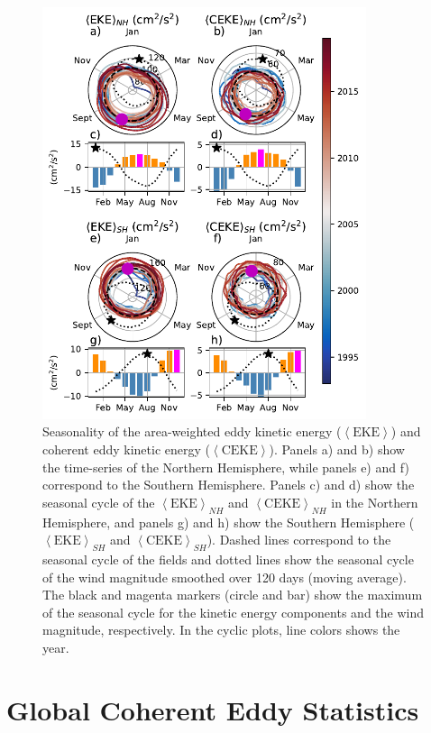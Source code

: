 \documentclass[draft,linenumbers]{agujournal2019}
\newcommand{\EKE}{\textrm{EKE}}
\newcommand{\CEKE}{\textrm{CEKE}}
\begin{document}
	\begin{figure}
	    \centering
	    \includegraphics[width=95mm]{figures/All_polar_plots.pdf}
	    \caption{Seasonality of the area-weighted eddy kinetic energy ($\left<\EKE\right>$) and coherent eddy kinetic energy ($\left<\CEKE\right>$). 
		Panels a) and b) show the time-series of the Northern Hemisphere, while panels e) and f) correspond to the Southern Hemisphere. Panels c) and d) show the seasonal cycle of the $\left<\EKE\right>_{NH}$ and $\left<\CEKE\right>_{NH}$ in the Northern Hemisphere, and panels g) and h) show the Southern Hemisphere ($\left<\EKE\right>_{SH}$ and $\left<\CEKE\right>_{SH}$).
		Dashed lines correspond to the seasonal cycle of the fields and dotted lines show the seasonal cycle of the wind magnitude smoothed over 120 days (moving average). 
		The black and magenta markers (circle and bar) show the maximum of the seasonal cycle for the kinetic energy components and the wind magnitude, respectively. In the cyclic plots, line colors shows the year.}
	    \label{fig:eddy_energy_polar}
	\end{figure}
	
	\section{Global Coherent Eddy Statistics}
	\label{sec:CE_stats}
\end{document}
